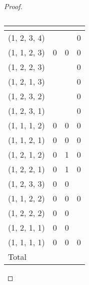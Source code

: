 \documentclass{article}
\begin{document}
\begin{proof}
\begin{table}[h]
\centering
\begin{tabular}{llll}
\multicolumn{1}{l|}{}        &  &  &  \\ \hline
\multicolumn{1}{l|}{(1, 2, 3, 4)} &       &         & 0             \\
\multicolumn{1}{l|}{(1, 1, 2, 3)} & 0             & 0             & 0             \\
\multicolumn{1}{l|}{(1, 2, 2, 3)} &            &             & 0             \\
\multicolumn{1}{l|}{(1, 2, 1, 3)} &            &              & 0             \\
\multicolumn{1}{l|}{(1, 2, 3, 2)} &            &              & 0             \\
\multicolumn{1}{l|}{(1, 2, 3, 1)} &            &              & 0             \\
\multicolumn{1}{l|}{(1, 1, 1, 2)} & 0             & 0             & 0             \\
\multicolumn{1}{l|}{(1, 1, 2, 1)} & 0             & 0             & 0             \\
\multicolumn{1}{l|}{(1, 2, 1, 2)} & 0             & 1             & 0             \\
\multicolumn{1}{l|}{(1, 2, 2, 1)} & 0             & 1             & 0             \\
\multicolumn{1}{l|}{(1, 2, 3, 3)} & 0             & 0             &         \\
\multicolumn{1}{l|}{(1, 1, 2, 2)} & 0             & 0             & 0             \\
\multicolumn{1}{l|}{(1, 2, 2, 2)} & 0             & 0             &              \\
\multicolumn{1}{l|}{(1, 2, 1, 1)} & 0             & 0             &              \\
\multicolumn{1}{l|}{(1, 1, 1, 1)} & 0             & 0             & 0             \\ \hline
\multicolumn{1}{l|}{Total}                             &             &             &            
\end{tabular}
\caption{}
\label{table:mN}
\end{table}


\end{proof}
\end{document}
